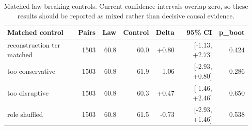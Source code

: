 \begin{table}[t]
\centering
\begin{tabular}{lrrrrrr}
\toprule
Matched control & Pairs & Law & Control & Delta & 95\% CI & p\_boot \\
\midrule
reconstruction tcr matched & 1503 & 60.8 & 60.0 & +0.80 & [-1.13, +2.73] & 0.424 \\
too conservative & 1503 & 60.8 & 61.9 & -1.06 & [-2.93, +0.80] & 0.286 \\
too disruptive & 1503 & 60.8 & 60.3 & +0.47 & [-1.46, +2.46] & 0.650 \\
role shuffled & 1503 & 60.8 & 61.5 & -0.73 & [-2.93, +1.46] & 0.538 \\
\bottomrule
\end{tabular}
\caption{Matched law-breaking controls. Current confidence intervals overlap zero, so these results should be reported as mixed rather than decisive causal evidence.}
\label{tab:ngc\_matched\_controls}
\end{table}
